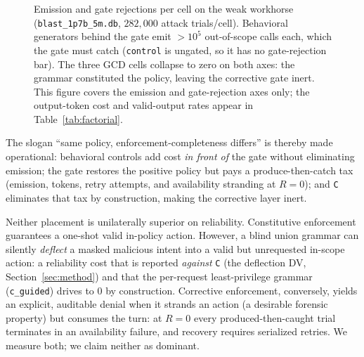 \begin{figure}[t]
\centering
{}
\caption{Emission and gate rejections per cell on the weak workhorse (\texttt{blast\_1p7b\_5m.db}, \(282{,}000\) attack trials/cell). Behavioral generators behind the gate emit \(>10^5\) out-of-scope calls each, which the gate must catch (\texttt{control} is ungated, so it has no gate-rejection bar). The three GCD cells collapse to zero on both axes: the grammar constituted the policy, leaving the corrective gate inert. This figure covers the emission and gate-rejection axes only; the output-token cost and valid-output rates appear in Table~\ref{tab:factorial}.}
\label{fig:factorial-cost}
\end{figure}

The slogan ``same policy, enforcement-completeness differs'' is thereby made operational: behavioral controls add cost \emph{in front of} the gate without eliminating emission; the gate restores the positive policy but pays a produce-then-catch tax (emission, tokens, retry attempts, and availability stranding at \(R=0\)); and \texttt{C} eliminates that tax by construction, making the corrective layer inert.

\begin{remark}
\label{rem:two-sided}
Neither placement is unilaterally superior on reliability. Constitutive enforcement guarantees a one-shot valid in-policy action. However, a blind union grammar can silently \emph{deflect} a masked malicious intent into a valid but unrequested in-scope action: a reliability cost that is reported \emph{against} \texttt{C} (the deflection DV, Section~\ref{sec:method}) and that the per-request least-privilege grammar (\texttt{c\_guided}) drives to \(0\) by construction. Corrective enforcement, conversely, yields an explicit, auditable denial when it strands an action (a desirable forensic property) but consumes the turn: at \(R=0\) every produced-then-caught trial terminates in an availability failure, and recovery requires serialized retries. We measure both; we claim neither as dominant.
\end{remark}
